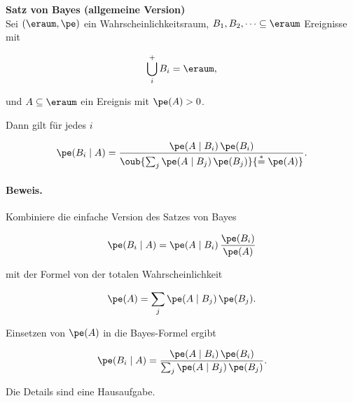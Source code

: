 \begin{satz}
    \textbf{Satz von Bayes (allgemeine Version)}   \\
    Sei \((\eraum,\pe)\) ein Wahrscheinlichkeitsraum,
    \(B_1,B_2,\dots \subseteq \eraum\) Ereignisse mit

    \[
        \bigcup^+_i B_i = \eraum,
    \]

    und \(A \subseteq \eraum\) ein Ereignis mit \(\pe(A)>0\).

    Dann gilt für jedes \(i\)

    \[
        \pe(B_i\mid A)
        =
        \frac{\pe(A\mid B_i)\,\pe(B_i)}
        {
        \oub{\sum_j \pe(A\mid B_j)\,\pe(B_j)}{\overset{*}{=}\pe(A)}
        }.
    \]

    \paragraph{Beweis.}

    Kombiniere die einfache Version des Satzes von Bayes

    \[
        \pe(B_i\mid A)
        =
        \pe(A\mid B_i)\,\frac{\pe(B_i)}{\pe(A)}
    \]

    mit der Formel von der totalen Wahrscheinlichkeit

    \[
        \pe(A)
        =
        \sum_j \pe(A\mid B_j)\,\pe(B_j).
    \]

    Einsetzen von \(\pe(A)\) in die Bayes-Formel ergibt

    \[
        \pe(B_i\mid A)
        =
        \frac{\pe(A\mid B_i)\,\pe(B_i)}
        {\sum_j \pe(A\mid B_j)\,\pe(B_j)}.
    \]

    Die Details sind eine Hausaufgabe.
\end{satz}